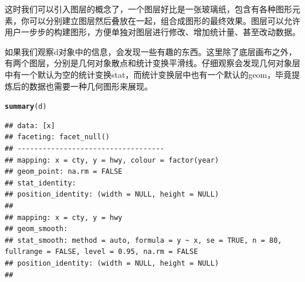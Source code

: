 \documentclass[UTF8,10pt]{ctexart}\usepackage{graphicx, color}
\makeatletter
\newcommand{\hlfunctioncall}[1]{\textcolor[rgb]{0.501960784313725,0,0.329411764705882}{\textbf{#1}}}%
\newenvironment{kframe}{%
 \def\at@end@of@kframe{}%
 \ifinner\ifhmode%
  \def\at@end@of@kframe{\end{minipage}}%
  \begin{minipage}{\columnwidth}%
 \fi\fi%
 \def\FrameCommand##1{\hskip\@totalleftmargin \hskip-\fboxsep
 \colorbox{shadecolor}{##1}\hskip-\fboxsep
     \hskip-\linewidth \hskip-\@totalleftmargin \hskip\columnwidth}%
 \MakeFramed {\advance\hsize-\width
   \@totalleftmargin\z@ \linewidth\hsize
   \@setminipage}}%
 {\par\unskip\endMakeFramed%
 \at@end@of@kframe}
\newenvironment{knitrout}{}{} %
\makeatother
\begin{document}
这时我们可以引入图层的概念了，一个图层好比是一张玻璃纸，包含有各种图形元素，你可以分别建立图层然后叠放在一起，组合成图形的最终效果。图层可以允许用户一步步的构建图形，方便单独对图层进行修改、增加统计量、甚至改动数据。

如果我们观察d对象中的信息，会发现一些有趣的东西。这里除了底层画布之外，有两个图层，分别是几何对象散点和统计变换平滑线。仔细观察会发现几何对象层中有一个默认为空的统计变换stat，而统计变换层中也有一个默认的geom，毕竟提炼后的数据也需要一种几何图形来展现。
\begin{knitrout}
\color{fgcolor}\begin{kframe}
\begin{alltt}
\hlfunctioncall{summary}(d)
\end{alltt}
\begin{verbatim}
## data: [x]
## faceting: facet_null() 
## -----------------------------------
## mapping: x = cty, y = hwy, colour = factor(year) 
## geom_point: na.rm = FALSE 
## stat_identity:  
## position_identity: (width = NULL, height = NULL)
## 
## mapping: x = cty, y = hwy 
## geom_smooth:  
## stat_smooth: method = auto, formula = y ~ x, se = TRUE, n = 80, fullrange = FALSE, level = 0.95, na.rm = FALSE 
## position_identity: (width = NULL, height = NULL)
## 
\end{verbatim}
\end{kframe}
\end{knitrout}
\end{document}
